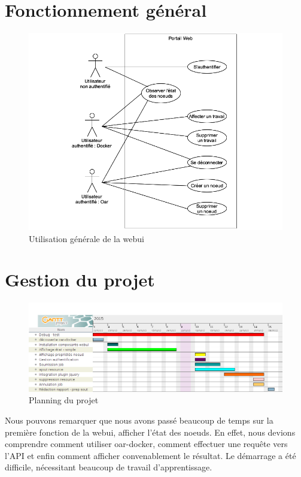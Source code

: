 \documentclass[a4paper,10pt]{article}
\begin{document}
\section{Fonctionnement général}
\begin{figure}[h]
  \begin{center}
    \includegraphics[scale=0.5]{./usr.png}
   \caption{\label{usr} Utilisation générale de la webui}
  \end{center}
\end{figure}

\section{Gestion du projet}
\begin{figure}[h]
  \begin{center}
    \includegraphics[scale=0.45]{./oardocker-planning.png}
   \caption{\label{oardocker-planning} Planning du projet}
  \end{center}
\end{figure}

Nous pouvons remarquer que nous avons passé beaucoup de temps sur la première fonction de la webui, afficher l'état des noeuds.
En effet, nous devions comprendre comment utiliser oar-docker, comment effectuer une requête vers l'API et enfin comment afficher convenablement le résultat.
Le démarrage a été difficile, nécessitant beaucoup de travail d'apprentissage.
\newpage
\end{document}
